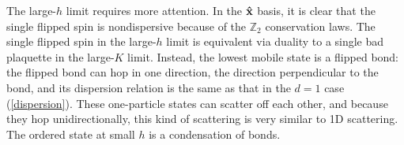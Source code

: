 \documentclass[prl,twocolumn,showpacs,superscriptaddress,preprintnumbers,amssymb]{revtex4}
\newcommand{\beq}{\begin{equation}}
\newcommand{\eeq}{\end{equation}}
\begin{document}
The large-$h$ limit requires more attention.  In the ${\bf \hat x}$ basis, it is clear that the
single flipped spin is nondispersive because of the ${\mathbb
Z}_2$ conservation laws.  The single flipped spin in the large-$h$ limit is equivalent via duality to a single bad plaquette in the large-$K$ limit.  Instead, the lowest mobile state is a
flipped bond: the flipped bond can hop in one direction, the
direction perpendicular to the bond, and its dispersion relation
is the same as that in the $d=1$ case (\ref{dispersion}).  These
one-particle states can scatter off each other, and because they
hop unidirectionally, this kind of scattering is very similar to
1D scattering.  The ordered state at small $h$ is a condensation of bonds.


\end{document}

